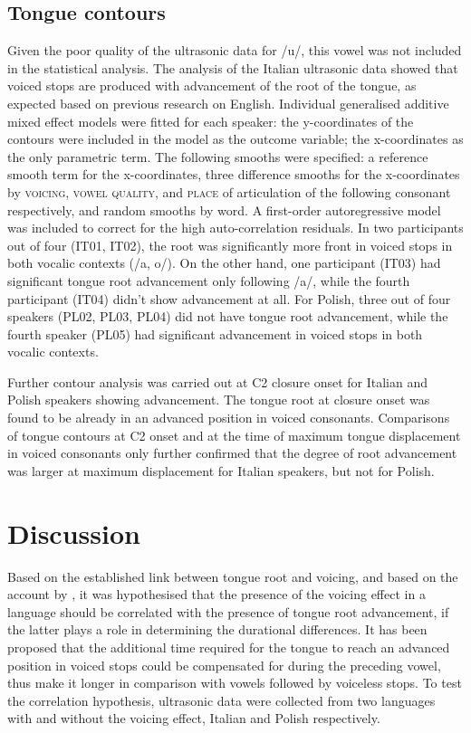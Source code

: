 \documentclass[authoryear, twocolumn]{elsarticle}
\begin{document}
\subsection{Tongue contours}\label{tongue-contours}

Given the poor quality of the ultrasonic data for /u/, this vowel was
not included in the statistical analysis. The analysis of the Italian
ultrasonic data showed that voiced stops are produced with advancement
of the root of the tongue, as expected based on previous research on
English. Individual generalised additive mixed effect models were fitted
for each speaker: the y-coordinates of the contours were included in the
model as the outcome variable; the x-coordinates as the only parametric
term. The following smooths were specified: a reference smooth term for
the x-coordinates, three difference smooths for the x-coordinates by
\textsc{voicing}, \textsc{vowel quality}, and \textsc{place} of
articulation of the following consonant respectively, and random smooths
by word. A first-order autoregressive model was included to correct for
the high auto-correlation residuals. In two participants out of four
(IT01, IT02), the root was significantly more front in voiced stops in
both vocalic contexts (/a, o/). On the other hand, one participant
(IT03) had significant tongue root advancement only following /a/, while
the fourth participant (IT04) didn't show advancement at all. For
Polish, three out of four speakers (PL02, PL03, PL04) did not have
tongue root advancement, while the fourth speaker (PL05) had significant
advancement in voiced stops in both vocalic contexts.

Further contour analysis was carried out at C2 closure onset for Italian
and Polish speakers showing advancement. The tongue root at closure
onset was found to be already in an advanced position in voiced
consonants. Comparisons of tongue contours at C2 onset and at the time
of maximum tongue displacement in voiced consonants only further
confirmed that the degree of root advancement was larger at maximum
displacement for Italian speakers, but not for Polish.

\section{Discussion}\label{discussion}

Based on the established link between tongue root and voicing, and based
on the account by \citet{halle1967}, it was hypothesised that the
presence of the voicing effect in a language should be correlated with
the presence of tongue root advancement, if the latter plays a role in
determining the durational differences. It has been proposed that the
additional time required for the tongue to reach an advanced position in
voiced stops could be compensated for during the preceding vowel, thus
make it longer in comparison with vowels followed by voiceless stops. To
test the correlation hypothesis, ultrasonic data were collected from two
languages with and without the voicing effect, Italian and Polish
respectively.
\end{document}
